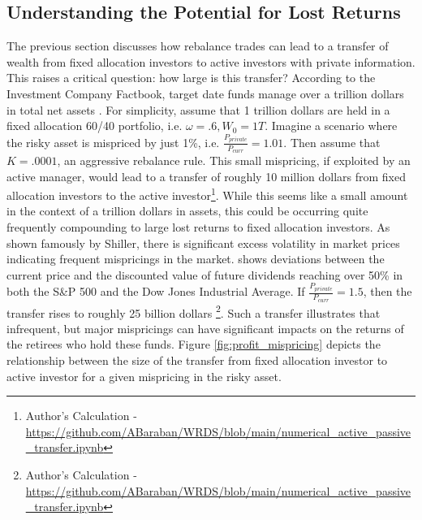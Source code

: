 \documentclass[12pt]{article}
\begin{document}
\subsection{Understanding the Potential for Lost Returns}
The previous section discusses how rebalance trades can lead to a transfer of wealth from fixed allocation investors to active investors with private information. This raises a critical question: how large is this transfer? According to the Investment Company Factbook, target date funds manage over a trillion dollars in total net assets \citep{ICIFactbook2024}. For simplicity, assume that 1 trillion dollars are held in a fixed allocation 60/40 portfolio, i.e. $\omega = .6, W_0 = 1T$. Imagine a scenario where the risky asset is mispriced by just 1\%, i.e. $\frac{P_{private}}{P_{curr}} = 1.01$. Then assume that $K = .0001$, an aggressive rebalance rule. This small mispricing, if exploited by an active manager, would lead to a transfer of roughly 10 million dollars from fixed allocation investors to the active investor\footnote{Author's Calculation - \url{https://github.com/ABaraban/WRDS/blob/main/numerical_active_passive_transfer.ipynb}}. While this seems like a small amount in the context of a trillion dollars in assets, this could be occurring quite frequently compounding to large lost returns to fixed allocation investors. As shown famously by Shiller, there is significant excess volatility in market prices indicating frequent mispricings in the market. \citet{shiller1981stock} shows deviations between the current price and the discounted value of future dividends reaching over 50\% in both the S\&P 500 and the Dow Jones Industrial Average. If $\frac{P_{private}}{P_{curr}} = 1.5$, then the transfer rises to roughly 25 billion dollars \footnote{Author's Calculation - \url{https://github.com/ABaraban/WRDS/blob/main/numerical_active_passive_transfer.ipynb}}. Such a transfer illustrates that infrequent, but major mispricings can have significant impacts on the returns of the retirees who hold these funds. Figure \ref{fig:profit_mispricing} depicts the relationship between the size of the transfer from fixed allocation investor to active investor for a given mispricing in the risky asset. 
\end{document}

